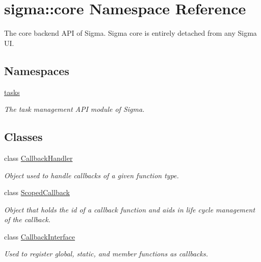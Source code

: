 \hypertarget{namespacesigma_1_1core}{\section{sigma\-:\-:core Namespace Reference}
\label{namespacesigma_1_1core}
}


The core backend A\-P\-I of Sigma. Sigma core is entirely detached from any Sigma U\-I.  


\subsection*{Namespaces}
\begin{DoxyCompactItemize}
\item 
\hyperlink{namespacesigma_1_1core_1_1tasks}{tasks}
\begin{DoxyCompactList}\small\item\em The task management A\-P\-I module of Sigma. \end{DoxyCompactList}\end{DoxyCompactItemize}
\subsection*{Classes}
\begin{DoxyCompactItemize}
\item 
class \hyperlink{classsigma_1_1core_1_1_callback_handler}{Callback\-Handler}
\begin{DoxyCompactList}\small\item\em Object used to handle callbacks of a given function type. \end{DoxyCompactList}\item 
class \hyperlink{classsigma_1_1core_1_1_scoped_callback}{Scoped\-Callback}
\begin{DoxyCompactList}\small\item\em Object that holds the id of a callback function and aids in life cycle management of the callback. \end{DoxyCompactList}\item 
class \hyperlink{classsigma_1_1core_1_1_callback_interface}{Callback\-Interface}
\begin{DoxyCompactList}\small\item\em Used to register global, static, and member functions as callbacks. \end{DoxyCompactList}\end{DoxyCompactItemize}
